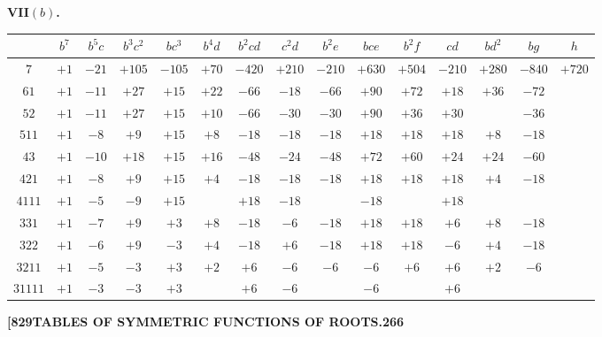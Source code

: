 \documentclass[12pt,a4paper]{article}
\theoremstyle{definition}
\begin{document}
\medskip

\noindent\textbf{VII$(b)$.}
\begin{center}
\small
\begin{tabular}{c|c|c|c|c|c|c|c|c|c|c|c|c|c|c}
& $b^7$ & $b^5c$ & $b^3c^2$ & $bc^3$ & $b^4d$ & $b^2cd$ & $c^2d$ & $b^2e$ & $bce$ & $b^2f$ & $cd$ & $bd^2$ & $bg$ & $h$ \\
\hline
$7$ & $+1$ & $-21$ & $+105$ & $-105$ & $+70$ & $-420$ & $+210$ & $-210$ & $+630$ & $+504$ & $-210$ & $+280$ & $-840$ & $+720$ \\
$61$ & $+1$ & $-11$ & $+27$ & $+15$ & $+22$ & $-66$ & $-18$ & $-66$ & $+90$ & $+72$ & $+18$ & $+36$ & $-72$ & \\
$52$ & $+1$ & $-11$ & $+27$ & $+15$ & $+10$ & $-66$ & $-30$ & $-30$ & $+90$ & $+36$ & $+30$ & & $-36$ & \\
$511$ & $+1$ & $-8$ & $+9$ & $+15$ & $+8$ & $-18$ & $-18$ & $-18$ & $+18$ & $+18$ & $+18$ & $+8$ & $-18$ & \\
$43$ & $+1$ & $-10$ & $+18$ & $+15$ & $+16$ & $-48$ & $-24$ & $-48$ & $+72$ & $+60$ & $+24$ & $+24$ & $-60$ & \\
$421$ & $+1$ & $-8$ & $+9$ & $+15$ & $+4$ & $-18$ & $-18$ & $-18$ & $+18$ & $+18$ & $+18$ & $+4$ & $-18$ & \\
$4111$ & $+1$ & $-5$ & $-9$ & $+15$ & & $+18$ & $-18$ & & $-18$ & & $+18$ & & & \\
$331$ & $+1$ & $-7$ & $+9$ & $+3$ & $+8$ & $-18$ & $-6$ & $-18$ & $+18$ & $+18$ & $+6$ & $+8$ & $-18$ & \\
$322$ & $+1$ & $-6$ & $+9$ & $-3$ & $+4$ & $-18$ & $+6$ & $-18$ & $+18$ & $+18$ & $-6$ & $+4$ & $-18$ & \\
$3211$ & $+1$ & $-5$ & $-3$ & $+3$ & $+2$ & $+6$ & $-6$ & $-6$ & $-6$ & $+6$ & $+6$ & $+2$ & $-6$ & \\
$31111$ & $+1$ & $-3$ & $-3$ & $+3$ & & $+6$ & $-6$ & & $-6$ & & $+6$ & & &
\end{tabular}
\end{center}

\newpage
\setcounter{page}{266}

\noindent\textbf{[829}\hfill\textbf{TABLES OF SYMMETRIC FUNCTIONS OF ROOTS.}\hfill\textbf{266}

\bigskip
\end{document}
